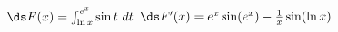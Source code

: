 {$\ds F(x) = \int_{\ln x}^{e^x} \sin t\ dt$
}
{$\ds F'(x) = e^x\sin (e^x) - \frac1x \sin(\ln x)$
}

